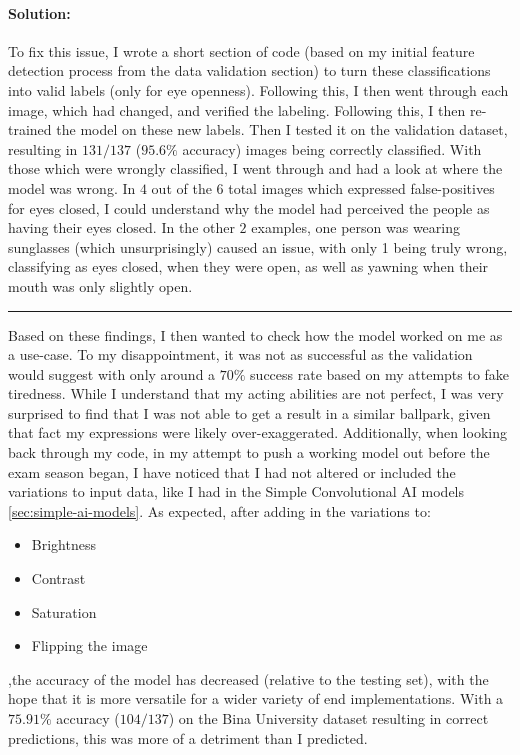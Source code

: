 \paragraph{Solution:}
To fix this issue, I wrote a short section of code (based on my initial feature detection process from the data validation section) to
turn these classifications into valid labels (only for eye openness). Following this, I then went through each image, which had changed,
and verified the labeling.
Following this, I then re-trained the model on these new labels. Then I tested it on the validation dataset, resulting in $131/137$
($95.6\%$ accuracy)  images being correctly classified. With those which were wrongly classified, I went through and had a look at where
the model was wrong. In $4$ out of the $6$ total images which expressed false-positives for eyes closed, I could understand why the model had
perceived the people as having their eyes closed. In the other $2$ examples, one person was wearing sunglasses (which unsurprisingly)
caused an issue, with only 1 being truly wrong, classifying as eyes closed, when they were open, as well as yawning when their mouth was
only slightly open.

\noindent\rule{\textwidth}{0.4pt}

Based on these findings, I then wanted to check how the model worked on me as a use-case. To my disappointment, it was not as successful
as the validation would suggest with only around a $70\%$ success rate based on my attempts to fake tiredness. While I understand that my
acting abilities are not perfect, I was very surprised to find that I was not able to get a result in a similar ballpark, given that fact
my expressions were likely over-exaggerated. Additionally, when looking back through my code, in my attempt to push a working model out
before the exam season began, I have noticed that I had not altered or included the variations to input data, like I had in the Simple
Convolutional AI models \ref{sec:simple-ai-models}.
As expected, after adding in the variations to:
\begin{itemize}
	\item Brightness
	\item Contrast
	\item Saturation
	\item Flipping the image
\end{itemize}
,the accuracy of the model has decreased (relative to the testing set), with the hope that it is more versatile for a wider variety of
end implementations. With a $75.91\%$ accuracy ($104/137$) on the Bina University dataset resulting in correct predictions, this was more of
a detriment than I predicted.

